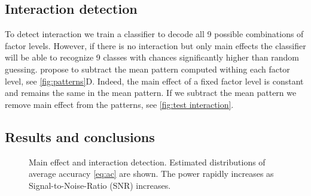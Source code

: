 \subsection{Interaction detection}

To detect interaction  we train a classifier to decode all 9 possible combinations of factor levels. However, if there is no interaction but only main effects the classifier will be able to recognize 9 classes with chances significantly higher than random guessing. \cite{Kornysheva2014} propose to subtract the mean pattern computed withing each factor level, see \autoref{fig:patterns}D. Indeed, the main effect of a fixed factor level is constant and remains the same in the mean pattern. If we subtract the mean pattern we remove main effect from the patterns, see \autoref{fig:test interaction}.

\subsection{Results and conclusions}

\begin{figure}[p]
\hfill
{}
\caption{Main effect and interaction detection. Estimated distributions of average accuracy \eqref{eq:ac} are shown. The power rapidly increases as Signal-to-Noise-Ratio (SNR) increases.}
\label{fig:knn2 convergence}
\end{figure}

